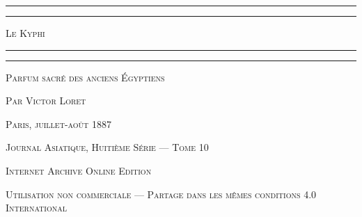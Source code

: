 \documentclass[a4paper, 11pt, oneside, landscape]{article}
\begin{document}
\begin{titlepage} %
	\centering %

	
	\rule{\textwidth}{1.6pt}\vspace*{-\baselineskip}\vspace*{2pt} %
	\rule{\textwidth}{0.4pt} %
	
	\vspace{1\baselineskip} %

	{\scshape\Huge Le Kyphi}
	
	\vspace{1\baselineskip} %

	\rule{\textwidth}{0.4pt}\vspace*{-\baselineskip}\vspace{3.2pt} %
	\rule{\textwidth}{1.6pt} %
	
	\vspace{1\baselineskip} %
	
	
	{\scshape Parfum sacré des anciens Égyptiens} %
	
	\vspace*{1\baselineskip} %
	
        {\scshape Par \Large Victor Loret} %
    
        \vspace*{\fill}

	\vspace{1\baselineskip}

	{\small\scshape Paris, juillet-août 1887}
	
	{\small\scshape{Journal Asiatique, Huitième Série --- Tome 10}}
	
	\vspace{0.5\baselineskip} %

        \scshape Internet Archive Online Edition  %
	
	{\scshape\small Utilisation non commerciale --- Partage dans les mêmes conditions 4.0 International} %
\end{titlepage}
\setlength{\parskip}{1mm plus1mm minus1mm}
\large
\clearpage
\tableofcontents
\clearpage
\end{document}
